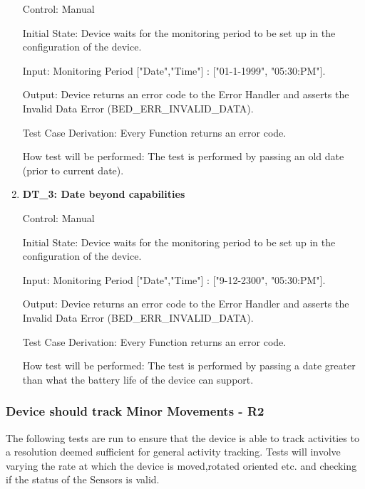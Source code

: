 \documentclass[12pt, titlepage]{article}
\begin{document}
\begin{enumerate}
		Control: Manual 
							
		Initial State: Device waits for the monitoring period to be set up in the configuration of the device.
							
		Input: Monitoring Period ["Date","Time"] : ["01-1-1999", "05:30:PM"].
							
		Output: Device returns an error code to the Error Handler and asserts the Invalid Data Error (BED\_ERR\_INVALID\_DATA).
		
		Test Case Derivation: Every Function returns an error code.
		
		How test will be performed: The test is performed by passing an old date (prior to current date).

	\item{\textbf{DT\_3: Date beyond capabilities}\\}
		
		Control: Manual 
							
		Initial State: Device waits for the monitoring period to be set up in the configuration of the device.
							
		Input: Monitoring Period ["Date","Time"] : ["9-12-2300", "05:30:PM"].
							
		Output: Device returns an error code to the Error Handler and asserts the Invalid Data Error (BED\_ERR\_INVALID\_DATA).
		
		Test Case Derivation: Every Function returns an error code.
		
		How test will be performed: The test is performed by passing a date greater than what the battery life of the device can support.

\end{enumerate}

\subsubsection{Device should track Minor Movements - \textbf{R2}}
The following tests are run to ensure that the device is able to track activities to a resolution deemed sufficient for general activity tracking. Tests will involve varying the rate at which the device is moved,rotated oriented etc. and checking if the status of the Sensors is valid.
\end{document}
